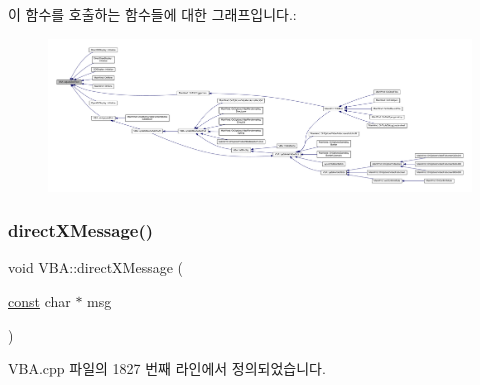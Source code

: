 이 함수를 호출하는 함수들에 대한 그래프입니다.\+:
\nopagebreak
\begin{figure}[H]
\begin{center}
\leavevmode
\includegraphics[width=350pt]{class_v_b_a_acb822065cba8b15810c5a61fd05ca831_icgraph}
\end{center}
\end{figure}
\mbox{\label{class_v_b_a_acb1288f72a2122817f05df2da91a67d2}} 
\subsubsection{\texorpdfstring{direct\+X\+Message()}{directXMessage()}}
{\footnotesize\ttfamily void V\+B\+A\+::direct\+X\+Message (\begin{DoxyParamCaption}\item[{\mbox{\hyperlink{getopt1_8c_a2c212835823e3c54a8ab6d95c652660e}{const}} char $\ast$}]{msg }\end{DoxyParamCaption})}



V\+B\+A.\+cpp 파일의 1827 번째 라인에서 정의되었습니다.


